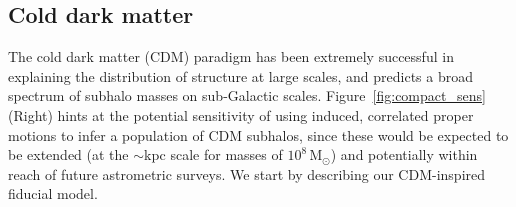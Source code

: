 \documentclass[twocolumn]{aastex63}
\begin{document}

\subsection{Cold dark matter}
\label{sec:cdmpop}

The cold dark matter (CDM) paradigm has been extremely successful in explaining the distribution of structure at large scales, and predicts a broad spectrum of subhalo masses on sub-Galactic scales. Figure~\ref{fig:compact_sens} (Right) hints at the potential sensitivity of using induced, correlated proper motions to infer a population of CDM subhalos, since these would be expected to be extended (at the $\sim$kpc scale for masses of $10^8\,\mathrm{M}_\odot$) and potentially within reach of future astrometric surveys. We start by describing our CDM-inspired fiducial model.
\end{document}
